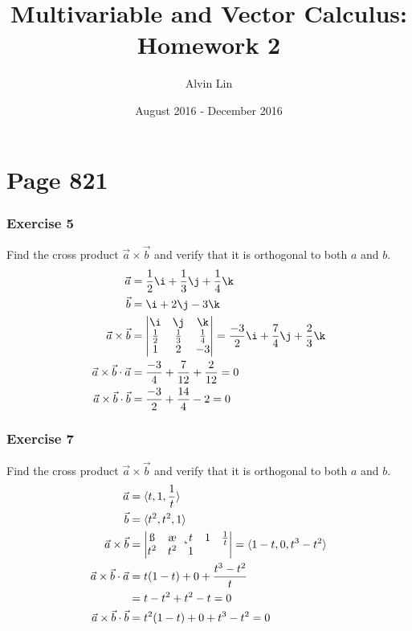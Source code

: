 \documentclass{math}
\title{Multivariable and Vector Calculus: Homework 2}
\author{Alvin Lin}
\date{August 2016 - December 2016}
\begin{document}
\maketitle

\section*{Page 821}

\subsubsection*{Exercise 5}
Find the cross product \( \vec{a}\times\vec{b} \) and verify that it is
orthogonal to both \( a \) and \( b \).
\begin{align*}
  \vec{a} &= \frac{1}{2}\i+\frac{1}{3}\j+\frac{1}{4}\k \\
  \vec{b} &= \i+2\j-3\k \\
  \vec{a}\times\vec{b} &= \begin{vmatrix}
    \i & \j & \k \\
    \frac{1}{2} & \frac{1}{3} & \frac{1}{4} \\
    1 & 2 & -3
  \end{vmatrix} = \frac{-3}{2}\i+\frac{7}{4}\j+\frac{2}{3}\k \\
  \vec{a}\times\vec{b}\cdot\vec{a} &=
    \frac{-3}{4}+\frac{7}{12}+\frac{2}{12} = 0 \\
  \vec{a}\times\vec{b}\cdot\vec{b} &=
    \frac{-3}{2}+\frac{14}{4}-2 = 0
\end{align*}

\subsubsection*{Exercise 7}
Find the cross product \( \vec{a}\times\vec{b} \) and verify that it is
orthogonal to both \( a \) and \( b \).
\begin{align*}
  \vec{a} &= \langle t,1,\frac{1}{t}\rangle \\
  \vec{b} &= \langle t^2,t^2,1\rangle \\
  \vec{a}\times\vec{b} &= \begin{vmatrix}
    \i & \j & \k \\
    t & 1 & \frac{1}{t} \\
    t^2 & t^2 & 1
  \end{vmatrix} = \langle1-t,0,t^3-t^2\rangle \\
  \vec{a}\times\vec{b}\cdot\vec{a} &=
    t(1-t)+0+\frac{t^3-t^2}{t} \\
  &= t-t^2+t^2-t = 0 \\
  \vec{a}\times\vec{b}\cdot\vec{b} &=
    t^2(1-t)+0+t^3-t^2 = 0
\end{align*}
\end{document}
